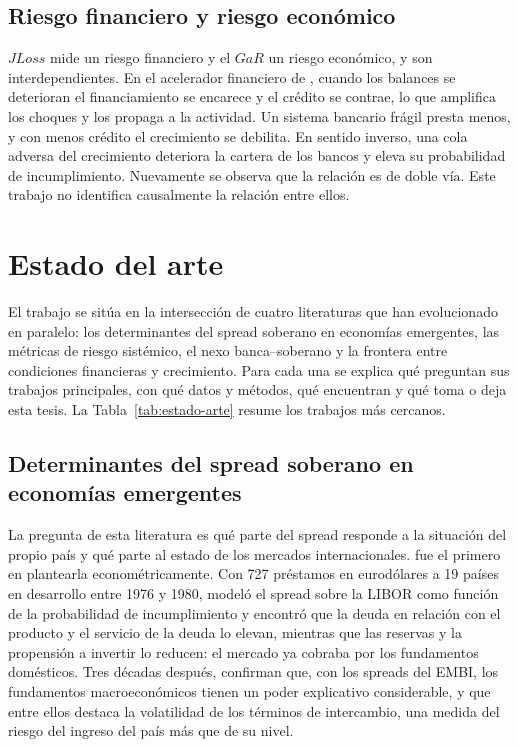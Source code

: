 \subsection{Riesgo financiero y riesgo económico}
\label{sec:marco-relacion}

$JLoss$ mide un riesgo financiero y el $GaR$ un riesgo económico, y son interdependientes. En el acelerador financiero de \citet{BernankeGertlerGilchrist1996}, cuando los balances se deterioran el financiamiento se encarece y el crédito se contrae, lo que amplifica los choques y los propaga a la actividad. Un sistema bancario frágil presta menos, y con menos crédito el crecimiento se debilita. En sentido inverso, una cola adversa del crecimiento deteriora la cartera de los bancos y eleva su probabilidad de incumplimiento. Nuevamente se observa que la relación es de doble vía. Este trabajo no identifica causalmente la relación entre ellos.

\section{Estado del arte}
\label{sec:literatura}

El trabajo se sitúa en la intersección de cuatro literaturas que han evolucionado en paralelo: los determinantes del spread soberano en economías emergentes, las métricas de riesgo sistémico, el nexo banca--soberano y la frontera entre condiciones financieras y crecimiento. Para cada una se explica qué preguntan sus trabajos principales, con qué datos y métodos, qué encuentran y qué toma o deja esta tesis. La Tabla~\ref{tab:estado-arte} resume los trabajos más cercanos.

\subsection{Determinantes del spread soberano en economías emergentes}

La pregunta de esta literatura es qué parte del spread responde a la situación del propio país y qué parte al estado de los mercados internacionales. \citet{Edwards1984} fue el primero en plantearla econométricamente. Con 727 préstamos en eurodólares a 19 países en desarrollo entre 1976 y 1980, modeló el spread sobre la LIBOR como función de la probabilidad de incumplimiento y encontró que la deuda en relación con el producto y el servicio de la deuda lo elevan, mientras que las reservas y la propensión a invertir lo reducen: el mercado ya cobraba por los fundamentos domésticos. Tres décadas después, \citet{HilscherNosbusch2010} confirman que, con los spreads del EMBI, los fundamentos macroeconómicos tienen un poder explicativo considerable, y que entre ellos destaca la volatilidad de los términos de intercambio, una medida del riesgo del ingreso del país más que de su nivel.

